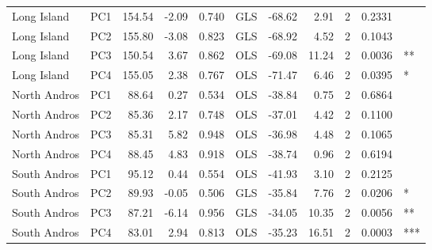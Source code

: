 \begin{tabular}{llrrrlrrrrl}
Long Island & PC1 & 154.54 & -2.09 & 0.740 & GLS & -68.62 & 2.91 & 2 & 0.2331 & \\
Long Island & PC2 & 155.80 & -3.08 & 0.823 & GLS & -68.92 & 4.52 & 2 & 0.1043 & \\
Long Island & PC3 & 150.54 & 3.67 & 0.862 & OLS & -69.08 & 11.24 & 2 & 0.0036 & **\\
Long Island & PC4 & 155.05 & 2.38 & 0.767 & OLS & -71.47 & 6.46 & 2 & 0.0395 & *\\
North Andros & PC1 & 88.64 & 0.27 & 0.534 & OLS & -38.84 & 0.75 & 2 & 0.6864 & \\
North Andros & PC2 & 85.36 & 2.17 & 0.748 & OLS & -37.01 & 4.42 & 2 & 0.1100 & \\
North Andros & PC3 & 85.31 & 5.82 & 0.948 & OLS & -36.98 & 4.48 & 2 & 0.1065 & \\
North Andros & PC4 & 88.45 & 4.83 & 0.918 & OLS & -38.74 & 0.96 & 2 & 0.6194 & \\
South Andros & PC1 & 95.12 & 0.44 & 0.554 & OLS & -41.93 & 3.10 & 2 & 0.2125 & \\
South Andros & PC2 & 89.93 & -0.05 & 0.506 & GLS & -35.84 & 7.76 & 2 & 0.0206 & *\\
South Andros & PC3 & 87.21 & -6.14 & 0.956 & GLS & -34.05 & 10.35 & 2 & 0.0056 & **\\
South Andros & PC4 & 83.01 & 2.94 & 0.813 & OLS & -35.23 & 16.51 & 2 & 0.0003 & ***\\
\bottomrule
\end{tabular}